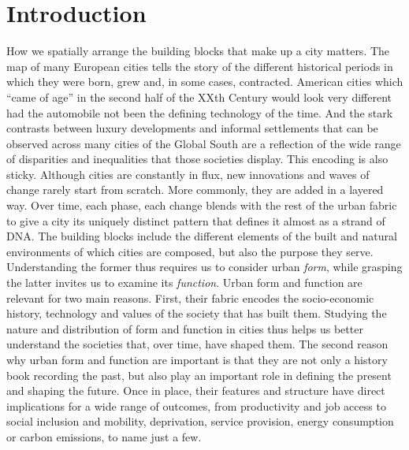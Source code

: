 \section{Introduction}
\label{sec:intro}

How we spatially arrange the building blocks that make up a city matters.
%
The map of many European cities tells the story of the different historical
periods in which they were born, grew and, in some cases, contracted.
%
American cities which ``came of age'' in the second half of the XXth Century
would look very different had the automobile not been the defining
technology of the time.
%
And the stark contrasts between luxury developments and informal settlements
that can be observed across many cities of the Global South are a reflection
of the wide range of disparities and inequalities that those societies
display.
%
This encoding is also sticky. Although cities are constantly in flux, new
innovations and waves of change rarely start from scratch. More commonly, they
are added in a layered way. Over time, each phase, each change blends with the rest
of the urban fabric to give a city its uniquely distinct pattern that defines
it almost as a strand of DNA.
The building blocks include the different
elements of the built and natural environments of which cities are composed,
but also the purpose they serve.
Understanding the former thus requires us to consider urban \textit{form}, while
grasping the latter invites us to examine its \textit{function}.
Urban form and function are relevant for two main reasons. First, their fabric
encodes the socio-economic history, technology and values
of the society that has built them.
%
Studying the nature and distribution
of form and function in cities thus helps us better understand the societies
that, over time, have shaped them.
The second reason why urban form and function are important is that they are
not only a history book recording the past, but also play an important role in
defining the present and shaping the future.
%
Once in place, their features and structure have direct implications for a
wide range of outcomes, from productivity and job access to social inclusion
and mobility, deprivation, service provision, energy consumption or carbon
emissions, to name just a few.


